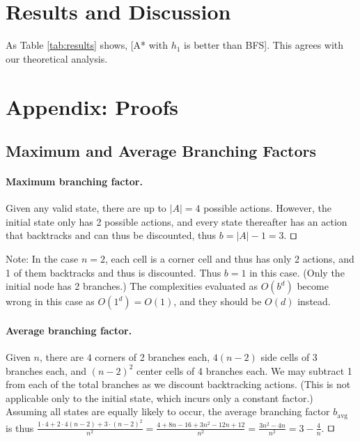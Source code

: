 \documentclass[runningheads]{llncs}
\begin{document}
\section{Results and Discussion}

As Table \ref{tab:results} shows, [A* with $h_1$ is better than BFS].
This agrees with our theoretical analysis.




\appendix
\section{Appendix: Proofs}
\label{app:proofs}


\subsection{Maximum and Average Branching Factors}
\label{subsec:branchingfactors}
\paragraph{Maximum branching factor.} Given any valid state, there are up to $|A|=4$ possible actions. However, the initial state only has 2 possible actions, and every state thereafter has an action that backtracks and can thus be discounted, thus $b = |A|-1 = 3$. $\qed$

Note: In the case $n=2$, each cell is a corner cell and thus has only 2 actions, and 1 of them backtracks and thus is discounted. Thus $b = 1$ in this case. (Only the initial node has 2 branches.) The complexities evaluated as $O(b^d)$ become wrong in this case as $O(1^d) = O(1)$, and they should be $O(d)$ instead.

\paragraph{Average branching factor.} Given $n$, there are $4$ corners of 2 branches each, $4(n-2)$ side cells of 3 branches each, and $(n-2)^2$ center cells of 4 branches each. We may subtract 1 from each of the total branches as we discount backtracking actions. (This is not applicable only to the initial state, which incurs only a constant factor.) Assuming all states are equally likely to occur, the average branching factor $b_\text{avg}$ is thus $\frac{1\cdot 4 + 2\cdot 4(n-2) + 3\cdot (n-2)^2}{n^2} = \frac{4 + 8n - 16 + 3n^2 - 12n + 12}{n^2} = \frac{3n^2 - 4n}{n^2} = 3 - \frac{4}{n}$. $\qed$
\end{document}
